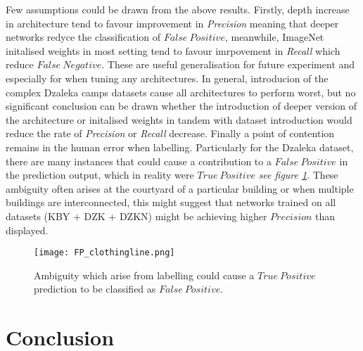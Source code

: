 \documentclass[11pt, a4paper, twoside]{report}
\begin{document}
Few assumptions could be drawn from the above results. Firstly, depth increase in architecture tend to favour improvement in \textit{Precision} meaning that deeper networks redyce the classification of $False\ Positive$, meanwhile, ImageNet initalised weights in most setting tend to favour imrpovement in \textit{Recall} which reduce $False\ Negative$. These are useful generalisation for future experiment and especially for when tuning any architectures. In general, introducion of the complex Dzaleka camps datasets cause all architectures to perform worst, but no significant conclusion can be drawn whether the introduction of deeper version of the architecture or initalised weights in tandem with dataset introduction would reduce the rate of \textit{Precision} or \textit{Recall} decrease. Finally a point of contention remains in the human error when labelling. Particularly for the Dzaleka dataset, there are many instances that could cause a contribution to a $False\ Positive$ in the prediction output, which in reality were $True\ Positive$ \textit{see figure \ref{fig:ambiguity}}. These ambiguity often arises at the courtyard of a particular building or when multiple buildings are interconnected, this might suggest that networks trained on all datasets (KBY + DZK + DZKN) might be achieving higher $Precision$ than displayed.\\\par

\begin{figure}[H]
  \centering
  \texttt{[image: FP\_clothingline.png]}
  \caption{Ambiguity which arise from labelling could cause a $True\ Positive$ prediction to be classified as $False\ Positive$.}
  \label{fig:ambiguity}
\end{figure}

\newpage

\chapter{Conclusion}\label{Conclude}
\end{document}
